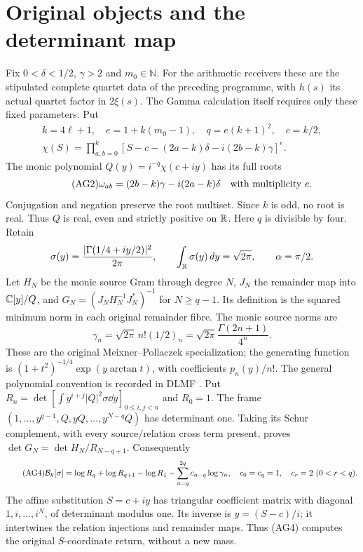 \section{Original objects and the determinant map}
Fix $0<\delta<1/2$, $\gamma>2$ and $m_0\in\mathbb N$. For the arithmetic
receivers these are the stipulated complete quartet data of the preceding
programme, with $h(s)$ its actual quartet factor in $2\xi(s)$.
The Gamma calculation itself requires only these fixed parameters. Put
\begin{equation}\tag{AG1}
\begin{gathered}
 k=4\ell+1,\quad e=1+k(m_0-1),\quad q=e(k+1)^2,\quad c=k/2,\\
 \chi(S)=\prod_{a,b=0}^k
 [S-c-(2a-k)\delta-i(2b-k)\gamma]^e.
\end{gathered}
\end{equation}
The monic polynomial $Q(y)=i^{-q}\chi(c+iy)$ has its full roots
\begin{equation}\tag{AG2}
 \omega_{ab}=(2b-k)\gamma-i(2a-k)\delta
 \quad\hbox{with multiplicity }e.
\end{equation}
Conjugation and negation preserve the root multiset. Since $k$ is odd,
no root is real. Thus $Q$ is real, even and strictly positive on $\mathbb R$.
Here $q$ is divisible by four. Retain
\[
 \sigma(y)=\frac{|\Gamma(1/4+iy/2)|^2}{2\pi},\qquad
 \int_\mathbb R\sigma(y)\,d y=\sqrt{2\pi},\qquad \alpha=\pi/2.
\]
Let $H_N$ be the monic source Gram through degree $N$, $J_N$ the remainder
map into $\mathbb C[y]/Q$, and $G_N=(J_NH_N^{-1}J_N^*)^{-1}$ for $N\ge q-1$.
Its definition is the squared minimum norm in each original remainder fibre.
The monic source norms are
\begin{equation}\tag{AG3}
 \gamma_n=\sqrt{2\pi}\,n!(1/2)_n
 =\sqrt{2\pi}\frac{\Gamma(2n+1)}{4^n}.
\end{equation}
These are the original Meixner--Pollaczek specialization; the generating
function is $(1+t^2)^{-1/4}\exp(y\arctan t)$, with coefficients $p_n(y)/n!$.
The general polynomial convention is recorded in DLMF \cite{a03ag:DLMF}.
Put $R_n=\det[\int y^{i+j}|Q|^2\sigma\dd y]_{0\le i,j<n}$ and $R_0=1$.
The frame $(1,\ldots,y^{q-1},Q,yQ,\ldots,y^{N-q}Q)$ has determinant one.
Taking its Schur complement, with every source/relation cross term present,
proves $\det G_N=\det H_N/R_{N-q+1}$. Consequently
\begin{equation}\tag{AG4}
 \mathcal B_k[\sigma]=\log R_q+\log R_{q+1}-\log R_1
       -\sum_{n=q}^{2q}c_{n-q}\log\gamma_n,
 \quad c_0=c_q=1,\quad c_r=2\ (0<r<q).
\end{equation}
The affine substitution $S=c+iy$ has triangular coefficient matrix with
diagonal $1,i,\ldots,i^N$, of determinant modulus one. Its inverse is
$y=(S-c)/i$; it intertwines the relation injections and remainder maps.
Thus (AG4) computes the original $S$-coordinate return, without a new mass.

